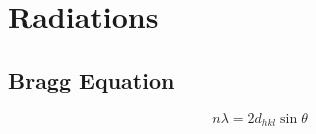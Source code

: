 \documentclass[a4paper]{report}
\begin{document}
\chapter{Radiations} 

  \begin{multicols}{2}
  
    \section{Bragg Equation}

      $$n \lambda = 2d_{hkl} \sin \theta$$

 \end{multicols}
\end{document}
